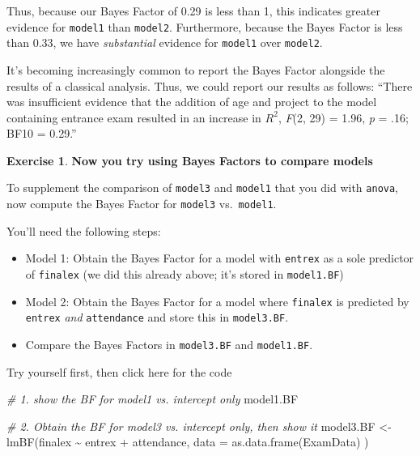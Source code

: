 \documentclass[
]{book}
\newenvironment{Shaded}{\begin{snugshade}}{\end{snugshade}}
\newcommand{\AttributeTok}[1]{\textcolor[rgb]{0.77,0.63,0.00}{#1}}
\newcommand{\CommentTok}[1]{\textcolor[rgb]{0.56,0.35,0.01}{\textit{#1}}}
\newcommand{\FunctionTok}[1]{\textcolor[rgb]{0.00,0.00,0.00}{#1}}
\newcommand{\NormalTok}[1]{#1}
\newcommand{\OtherTok}[1]{\textcolor[rgb]{0.56,0.35,0.01}{#1}}
\newcommand{\SpecialCharTok}[1]{\textcolor[rgb]{0.00,0.00,0.00}{#1}}
\theoremstyle{definition}
\theoremstyle{definition}
\theoremstyle{definition}
\newtheorem{exercise}{Exercise}[chapter]
\theoremstyle{definition}
\theoremstyle{remark}
\begin{document}
Thus, because our Bayes Factor of 0.29 is less than 1, this indicates greater evidence for \texttt{model1} than \texttt{model2}. Furthermore, because the Bayes Factor is less than 0.33, we have \emph{substantial} evidence for \texttt{model1} over \texttt{model2}.

\hfill\break
It's becoming increasingly common to report the Bayes Factor alongside the results of a classical analysis. Thus, we could report our results as follows: ``There was insufficient evidence that the addition of age and project to the model containing entrance exam resulted in an increase in \(R^2\), \emph{F}(2, 29) = 1.96, \emph{p} = .16; BF10 = 0.29.''

\begin{exercise}
\textbf{Now you try using Bayes Factors to compare models}

To supplement the comparison of \texttt{model3} and \texttt{model1} that you did with \texttt{anova}, now compute the Bayes Factor for \texttt{model3} vs.~\texttt{model1}.

\hfill\break
You'll need the following steps:

\begin{itemize}
\item
  Model 1: Obtain the Bayes Factor for a model with \texttt{entrex} as a sole predictor of \texttt{finalex} (we did this already above; it's stored in \texttt{model1.BF})
\item
  Model 2: Obtain the Bayes Factor for a model where \texttt{finalex} is predicted by \texttt{entrex} \emph{and} \texttt{attendance} and store this in \texttt{model3.BF}.
\item
  Compare the Bayes Factors in \texttt{model3.BF} and \texttt{model1.BF}.\\
\end{itemize}

Try yourself first, then click here for the code

\begin{Shaded}
\begin{Highlighting}[]
\CommentTok{\# 1. show the BF for model1 vs. intercept only}
\NormalTok{model1.BF  }

\CommentTok{\# 2. Obtain the BF for model3 vs. intercept only, then show it}
\NormalTok{model3.BF }\OtherTok{\textless{}{-}} \FunctionTok{lmBF}\NormalTok{(finalex }\SpecialCharTok{\textasciitilde{}}\NormalTok{ entrex }\SpecialCharTok{+}\NormalTok{ attendance, }\AttributeTok{data =} \FunctionTok{as.data.frame}\NormalTok{(ExamData) )}


\end{Highlighting}
\end{Shaded}
\end{exercise}
\end{document}
